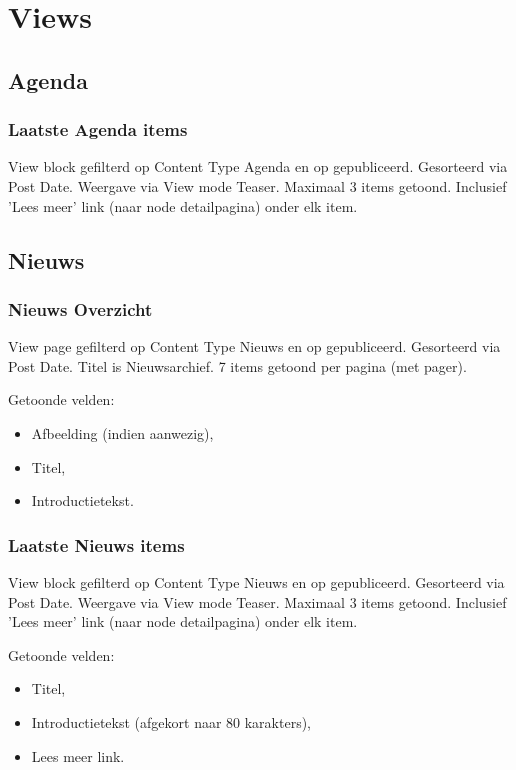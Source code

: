 \section{Views}\label{views}

\subsection{Agenda}
\subsubsection{Laatste Agenda items}\label{laatste-agenda-items}
View block gefilterd op Content Type Agenda en op gepubliceerd. Gesorteerd via Post Date. Weergave via View mode Teaser. Maximaal 3 items getoond. Inclusief 'Lees meer' link (naar node detailpagina) onder elk item.

\subsection{Nieuws}
\subsubsection{Nieuws Overzicht}\label{nieuws-overzicht}
View page gefilterd op Content Type Nieuws en op gepubliceerd. Gesorteerd via Post Date. Titel is Nieuwsarchief. 7 items getoond per pagina (met pager).

Getoonde velden:
\begin{itemize}
\item Afbeelding (indien aanwezig),
\item Titel,
\item Introductietekst.
\end{itemize}

\subsubsection{Laatste Nieuws items}\label{laatste-nieuws-items}
View block gefilterd op Content Type Nieuws en op gepubliceerd. Gesorteerd via Post Date. Weergave via View mode Teaser.
Maximaal 3 items getoond. Inclusief 'Lees meer' link (naar node detailpagina) onder elk item.

Getoonde velden:
\begin{itemize}
\item Titel,
\item Introductietekst (afgekort naar 80 karakters),
\item Lees meer link.
\end{itemize}

